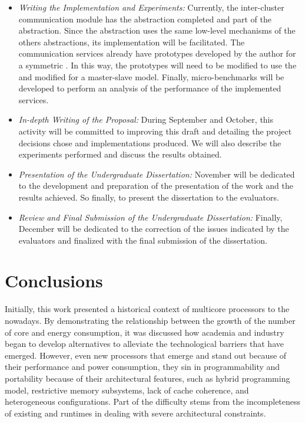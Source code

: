	\begin{itemize}
		\item \textit{Writing the Implementation and Experiments:}
			Currently, the inter-cluster communication module has the \sync abstraction
			completed and part of the \mailbox abstraction.
			Since the \portal abstraction uses the same low-level mechanisms of the others
			abstractions, its implementation will be facilitated.
			The communication services already have prototypes developed by the author
			for a symmetric \os.
			In this way, the prototypes will need to be modified to use the \hal and
			modified for a master-slave model.
			Finally, micro-benchmarks will be developed to perform an analysis of the
			performance of the implemented services.
		\item \textit{In-depth Writing of the Proposal:}
			During September and October, this activity will be committed to improving
			this draft and detailing the project decisions chose and implementations produced.
			We will also describe the experiments performed and discuss the results obtained.
		\item \textit{Presentation of the Undergraduate Dissertation:}
			November will be dedicated to the development and preparation of the presentation
			of the work and the results achieved.
			So finally, to present the dissertation to the evaluators.
		\item \textit{Review and Final Submission of the Undergraduate Dissertation:}
			Finally, December will be dedicated to the correction of the issues indicated
			by the evaluators and finalized with the final submission of the dissertation.
	\end{itemize}

 \chapter{Conclusions}
\label{ch.conclusions}

Initially, this work presented a historical context of multicore
processors to the nowadays.
By demonstrating the relationship between the growth of the number
of core and energy consumption, it was discussed how academia and
industry began to develop alternatives to alleviate the technological
barriers that have emerged.
However, even new processors that emerge and stand out because of
their performance and power consumption,
they sin in programmability and portability because of their architectural
features, such as hybrid programming model, restrictive memory subsystems,
lack of cache coherence, and heterogeneous configurations.
Part of the difficulty stems from the incompleteness of existing \oss and
runtimes in dealing with severe architectural constraints.

